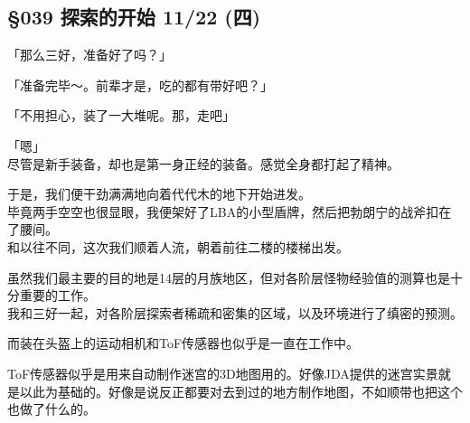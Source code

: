 \subsection{§039 探索的开始 11/22 (四)}

「那么三好，准备好了吗？」

「准备完毕～。前辈才是，吃的都有带好吧？」

「不用担心，装了一大堆呢。那，走吧」

「嗯」\\

尽管是新手装备，却也是第一身正经的装备。感觉全身都打起了精神。

于是，我们便干劲满满地向着代代木的地下开始进发。\\

毕竟两手空空也很显眼，我便架好了LBA的小型盾牌，然后把勃朗宁的战斧扣在了腰间。\\

和以往不同，这次我们顺着人流，朝着前往二楼的楼梯出发。

虽然我们最主要的目的地是14层的月族地区，但对各阶层怪物经验值的测算也是十分重要的工作。\\

我和三好一起，对各阶层探索者稀疏和密集的区域，以及环境进行了缜密的预测。

而装在头盔上的运动相机和ToF传感器也似乎是一直在工作中。

ToF传感器似乎是用来自动制作迷宫的3D地图用的。好像JDA提供的迷宫实景就是以此为基础的。好像是说反正都要对去到过的地方制作地图，不如顺带也把这个也做了什么的。\\

